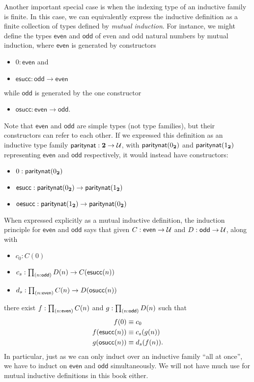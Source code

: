 Another important special case is when the indexing type of an inductive family is finite.
In this case, we can equivalently express the inductive definition as a finite collection of types defined by \emph{mutual induction}.
For instance, we might define the types $\mathsf{even}$ and $\mathsf{odd}$ of even and odd natural numbers by mutual induction, where $\mathsf{even}$ is generated by constructors
\begin{itemize}
\item $0:\mathsf{even}$ and
\item $\mathsf{esucc} : \mathsf{odd}\to\mathsf{even}$
\end{itemize}
while $\mathsf{odd}$ is generated by the one constructor
\begin{itemize}
\item $\mathsf{osucc} : \mathsf{even}\to \mathsf{odd}$.
\end{itemize}
Note that $\mathsf{even}$ and $\mathsf{odd}$ are simple types (not type families), but their constructors can refer to each other.
If we expressed this definition as an inductive type family $\mathsf{paritynat} : \mathbf{2} \to \mathcal{U}$, with $\mathsf{paritynat}({0_{\mathbf{2}}})$ and $\mathsf{paritynat}({1_{\mathbf{2}}})$ representing $\mathsf{even}$ and $\mathsf{odd}$ respectively, it would instead have constructors:
\begin{itemize}
\item $0 : \mathsf{paritynat}({0_{\mathbf{2}}})$
\item $\mathsf{esucc} : \mathsf{paritynat}({0_{\mathbf{2}}}) \to \mathsf{paritynat}({1_{\mathbf{2}}})$
\item $\mathsf{oesucc} : \mathsf{paritynat}({1_{\mathbf{2}}}) \to \mathsf{paritynat}({0_{\mathbf{2}}})$
\end{itemize}
When expressed explicitly as a mutual inductive definition, the induction principle for $\mathsf{even}$ and $\mathsf{odd}$ says that given $C:\mathsf{even}\to\mathcal{U}$ and $D:\mathsf{odd}\to\mathcal{U}$, along with
\begin{itemize}
\item $c_0 : C(0)$
\item $c_s : \prd{n:\mathsf{odd}} D(n) \to C(\mathsf{esucc}(n))$
\item $d_s : \prd{n:\mathsf{even}} C(n) \to D(\mathsf{osucc}(n))$
\end{itemize}
there exist $f:\prd{n:\mathsf{even}} C(n)$ and $g:\prd{n:\mathsf{odd}}D(n)$ such that
\begin{align*}
  f(0) &\equiv c_0\\
  f(\mathsf{esucc}(n)) &\equiv c_s(g(n))\\
  g(\mathsf{osucc}(n)) &\equiv d_s(f(n)).
\end{align*}
In particular, just as we can only induct over an inductive family ``all at once'', we have to induct on $\mathsf{even}$ and $\mathsf{odd}$ simultaneously.
We will not have much use for mutual inductive definitions in this book either.

